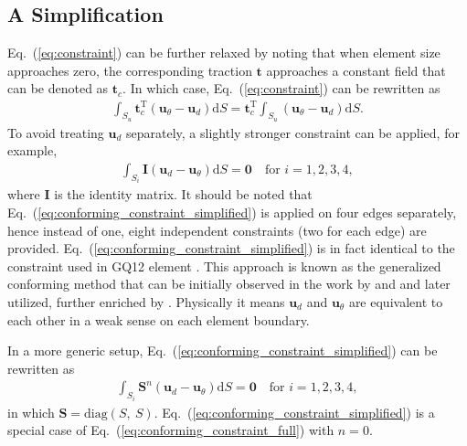 \documentclass[3p,sort&compress,review,11pt]{elsarticle}
\newcommand*{\md}[1]{\mathrm{d}#1}
\newcommand*{\mT}{\mathrm{T}}
\newcommand*{\eqsref}[1]{Eq.~(\ref{#1})}
\newcommand*{\mb}{\bm}
\begin{document}
\subsection{A Simplification}
\eqsref{eq:constraint} can be further relaxed by noting that when element size approaches zero, the corresponding traction $\mb{t}$ approaches a constant field that can be denoted as $\mb{t}_c$. In which case, \eqsref{eq:constraint} can be rewritten as
\begin{gather*}
\int_{S_u}\mb{t}_c^\mT\left(\mb{u}_\theta-\mb{u}_d\right)\md{S}=\mb{t}_c^\mT\int_{S_u}\left(\mb{u}_\theta-\mb{u}_d\right)\md{S}.
\end{gather*}
To avoid treating $\mb{u}_d$ separately, a slightly stronger constraint can be applied, for example,
\begin{gather}\label{eq:conforming_constraint_simplified}
\int_{S_i}\mb{I}\left(\mb{u}_d-\mb{u}_\theta\right)\md{S}=\mb{0}\quad\text{for $i=1,2,3,4$},
\end{gather}
where $\mb{I}$ is the  identity matrix. It should be noted that \eqsref{eq:conforming_constraint_simplified} is applied on four edges separately, hence instead of one, eight independent constraints (two for each edge) are provided. \eqsref{eq:conforming_constraint_simplified} is in fact identical to the constraint used in GQ12 element \citep{Long1994}. This approach is known as the generalized conforming method that can be initially observed in the work by \citet{Tang1984} and \citet{Wu1987} and later utilized,  further enriched by \citet{Long1994}. Physically it means $\mb{u}_d$ and $\mb{u}_\theta$ are equivalent to each other in a weak sense on each element boundary.

In a more generic setup, \eqsref{eq:conforming_constraint_simplified} can be rewritten as
\begin{gather}\label{eq:conforming_constraint_full}
\int_{S_i}\mb{S}^n\left(\mb{u}_d-\mb{u}_\theta\right)\md{S}=\mb{0}\quad\text{for $i=1,2,3,4$},
\end{gather}
in which $\mb{S}=\mathrm{diag}(S,~S)$. \eqsref{eq:conforming_constraint_simplified} is a special case of \eqsref{eq:conforming_constraint_full} with $n=0$.
\end{document}

